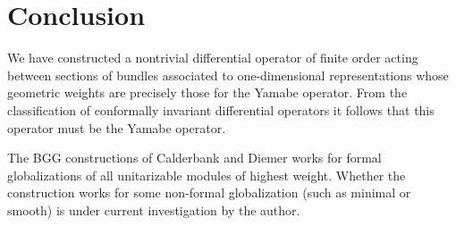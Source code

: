 \chapter*{Conclusion}


We have constructed a nontrivial differential operator of finite order acting between sections of bundles associated to one-dimensional representations whose geometric weights are precisely those for the Yamabe operator. From the classification of conformally invariant differential operators it follows that this operator must be the Yamabe operator. %

The BGG constructions of Calderbank and Diemer works for formal globalizations of all unitarizable modules of highest weight. Whether the construction works for some non-formal globalization (such as minimal or smooth) is under current investigation by the author.